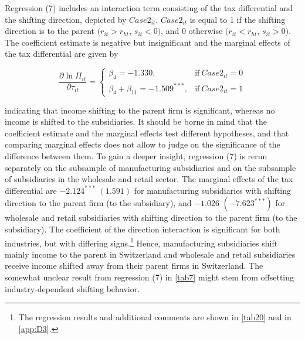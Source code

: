 \documentclass[10pt,twocolumn,oneside,cmyk]{article}
\begin{document}
Regression (7) includes an interaction term consisting of the tax differential and the shifting direction, depicted by $Case2_{it}$. $Case2_{it}$ is equal to 1 if the shifting direction is to the parent $(r_{it} > r_{ht}$, $s_{it} < 0)$, and 0 otherwise $(r_{it} < r_{ht}$, $s_{it} > 0)$. The coefficient estimate is negative but insignificant and the marginal effects of the tax differential are given by

\begin{equation}\label{eq15}
 \frac{\partial \ln \Pi_{it}}{\partial \tau_{it}} =
   \begin{cases}
    \beta_4 = -1.330, & \text{if}\ Case2_{it}=0 \\
    \beta_4 + \beta_{11} = -1.509^{***}, & \text{if}\ Case2_{it}=1
   \end{cases}
\end{equation}
\vspace{0.1cm}

indicating that income shifting to the parent firm is significant, whereas no income is shifted to the subsidiaries. It should be borne in mind that the coefficient estimate and the marginal effects test different hypotheses, and that comparing marginal effects does not allow to judge on the significance of the difference between them. To gain a deeper insight, regression (7) is rerun separately on the subsample of manufacturing subsidiaries and on the subsample of subsidiaries in the wholesale and retail sector. The marginal effects of the tax differential are $-2.124^{***}$ $(1.591)$ for manufacturing subsidiaries with shifting direction to the parent firm (to the subsidiary), and $-1.026$ $(-7.623^{***})$ for wholesale and retail subsidiaries with shifting direction to the parent firm (to the subsidiary). The coefficient of the direction interaction is significant for both industries, but with differing signs.\footnote{The regression results and additional comments are shown in \cref{tab20} and in \cref{app:D3}.} Hence, manufacturing subsidiaries shift mainly income to the parent in Switzerland and wholesale and retail subsidiaries receive income shifted away from their parent firms in Switzerland. The somewhat unclear result from regression (7) in \cref{tab7} might stem from offsetting industry-dependent shifting behavior.
\end{document}
